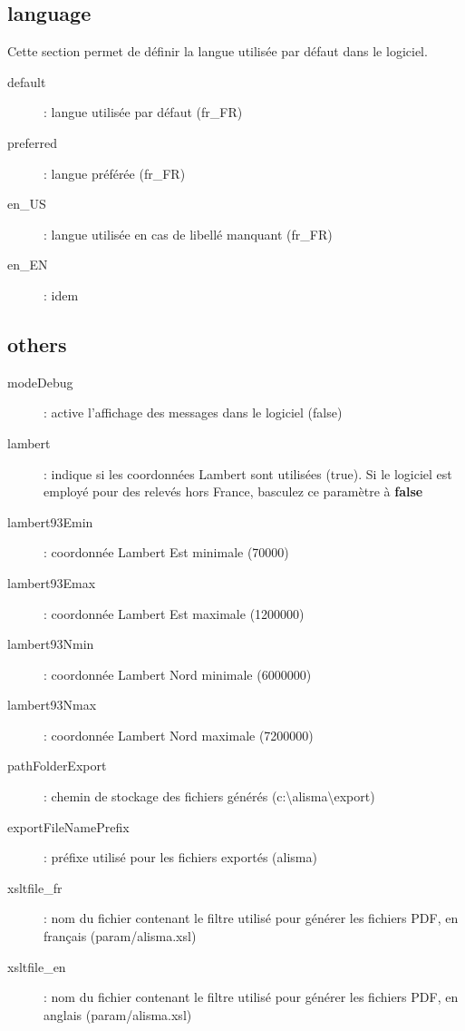 \subsection{language}

Cette section permet de définir la langue utilisée par défaut dans le logiciel.

\begin{description}
\item [default] : langue utilisée par défaut (fr\_FR)
\item [preferred] : langue préférée (fr\_FR)
\item[en\_US]: langue utilisée en cas de libellé manquant (fr\_FR)
\item [en\_EN] : idem
\end{description}


\subsection{others}

\begin{description}
\item [modeDebug] : active l'affichage des messages dans le logiciel (false)
\item [lambert] : indique si les coordonnées Lambert sont utilisées (true). Si le logiciel est employé pour des relevés hors France, basculez ce paramètre à \textbf{false}
\item [lambert93Emin] : coordonnée Lambert Est minimale (70000)
\item [lambert93Emax] : coordonnée Lambert Est maximale (1200000)
\item [lambert93Nmin] : coordonnée Lambert Nord minimale (6000000)
\item [lambert93Nmax] : coordonnée Lambert Nord maximale (7200000)
\item [pathFolderExport] : chemin de stockage des fichiers générés (c:\textbackslash{}alisma\textbackslash{}export)
\item [exportFileNamePrefix] : préfixe utilisé pour les fichiers exportés (alisma)
\item [xsltfile\_fr] : nom du fichier contenant le filtre utilisé pour générer les fichiers PDF, en français (param/alisma.xsl)
\item [xsltfile\_en] : nom du fichier contenant le filtre utilisé pour générer les fichiers PDF, en anglais (param/alisma.xsl)

\end{description}

